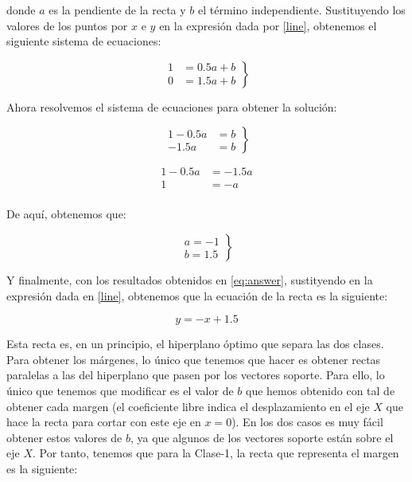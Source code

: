 \documentclass[11pt,a4paper]{article}
\begin{document}
\noindent donde $a$ es la pendiente de la recta y $b$ el término independiente. Sustituyendo los valores de los puntos por $x$ e $y$
en la expresión dada por \eqref{line}, obtenemos el siguiente sistema de ecuaciones:

\begin{equation}
\left.
\begin{aligned}
	1 &= 0.5a + b \\
	0 &= 1.5a + b
\end{aligned}
\right\rbrace
\end{equation}

Ahora resolvemos el sistema de ecuaciones para obtener la solución:

\begin{equation}
\left.
\begin{aligned}
	1 - 0.5a &= b \\
	-1.5a&= b
\end{aligned}
\right\rbrace
\end{equation}

\begin{equation}
\begin{aligned}
1 - 0.5a &= -1.5a \\
1 &= -a \\
\end{aligned}
\end{equation}

De aquí, obtenemos que:

\begin{equation}
\label{eq:answer}
\left.
\begin{aligned}
a = -1 \\
b = 1.5
\end{aligned}
\right\rbrace
\end{equation}

Y finalmente, con los resultados obtenidos en \eqref{eq:answer}, sustityendo en la expresión dada en \eqref{line}, obtenemos que la
ecuación de la recta es la siguiente:

\begin{equation}
y = -x + 1.5
\end{equation}

Esta recta es, en un principio, el hiperplano óptimo que separa las dos clases. Para obtener los márgenes, lo único que tenemos que
hacer es obtener rectas paralelas a las del hiperplano que pasen por los vectores soporte. Para ello, lo único que tenemos que
modificar es el valor de $b$ que hemos obtenido con tal de obtener cada margen (el coeficiente libre indica el desplazamiento
en el eje $X$ que hace la recta para cortar con este eje en $x = 0$). En los dos casos es muy fácil obtener estos valores de $b$,
ya que algunos de los vectores soporte están sobre el eje $X$. Por tanto, tenemos que para la Clase-1, la recta que representa el
margen es la siguiente:
\end{document}
